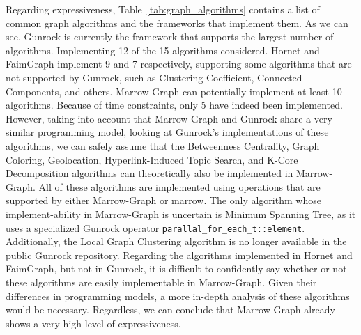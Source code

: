 Regarding expressiveness, Table~\ref{tab:graph_algorithms} contains a list of common graph algorithms and the frameworks that implement them. As we can see, Gunrock is currently the framework that supports the largest number of algorithms. Implementing 12 of the 15 algorithms considered. Hornet and FaimGraph implement 9 and 7 respectively, supporting some algorithms that are not supported by Gunrock, such as Clustering Coefficient, Connected Components, and others. Marrow-Graph can potentially implement at least 10 algorithms. Because of time constraints, only 5 have indeed been implemented. However, taking into account that Marrow-Graph and Gunrock share a very similar programming model, looking at Gunrock's implementations of these algorithms, we can safely assume that the Betweenness Centrality, Graph Coloring, Geolocation, Hyperlink-Induced Topic Search, and K-Core Decomposition algorithms can theoretically also be implemented in Marrow-Graph. All of these algorithms are implemented using operations that are supported by either Marrow-Graph or marrow. The only algorithm whose implement-ability in Marrow-Graph is uncertain is Minimum Spanning Tree, as it uses a specialized Gunrock operator \texttt{parallal\_for\_each\_t::element}. Additionally, the Local Graph Clustering algorithm is no longer available in the public Gunrock repository. Regarding the algorithms implemented in Hornet and FaimGraph, but not in Gunrock, it is difficult to confidently say whether or not these algorithms are easily implementable in Marrow-Graph. Given their differences in programming models, a more in-depth analysis of these algorithms would be necessary. Regardless, we can conclude that Marrow-Graph already shows a very high level of expressiveness. 


